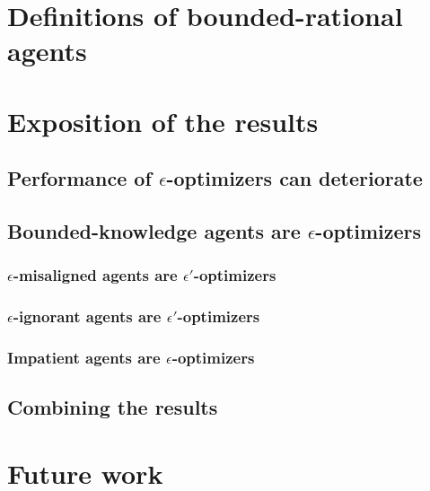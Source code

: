 \documentclass{article} %
\theoremstyle{remark}
\begin{document}
\section{Definitions of bounded-rational agents}\label{sec:def_bounded_rat}



\section{Exposition of the results}

\subsection{Performance of \texorpdfstring{$\epsilon$}{epsilon}-optimizers can deteriorate} \label{sec:policy_mod}


\subsection{Bounded-knowledge agents are \texorpdfstring{$\epsilon$}{epsilon}-optimizers} \label{sec:optimization_bounds}


\subsubsection{\texorpdfstring{$\epsilon$}{epsilon}-misaligned agents are \texorpdfstring{$\epsilon'$}{epsilon'}-optimizers}\label{sec:utility}


\subsubsection{\texorpdfstring{$\epsilon$}{epsilon}-ignorant agents are \texorpdfstring{$\epsilon'$}{epsilon'}-optimizers} \label{sec:belief}


\subsubsection{Impatient agents are \texorpdfstring{$\epsilon$}{epsilon}-optimizers} \label{sec:gammas}


\subsection{Combining the results} \label{sec:combining}


\section{Future work} \label{sec:conclusions}

\end{document}
